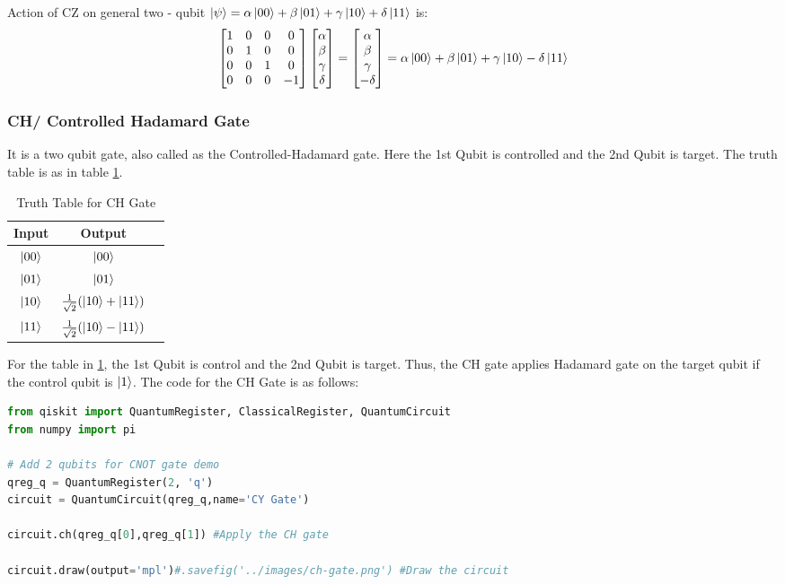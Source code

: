 Action of CZ on general two - qubit $\ket{\psi} = \alpha\ket{00}+\beta\ket{01}+\gamma\ket{10}+\delta\ket{11}$ is:
\[
    \begin{bmatrix} 
        1 & 0 & 0 & 0 \\
        0 & 1 & 0 & 0 \\
        0 & 0 & 1 & 0 \\
        0 & 0 & 0 & -1
    \end{bmatrix}\begin{bmatrix}
        \alpha \\
        \beta \\
        \gamma \\
        \delta
    \end{bmatrix}=\begin{bmatrix}
        \alpha \\
        \beta \\
        \gamma \\
        -\delta
    \end{bmatrix}=\alpha\ket{00}+\beta\ket{01}+\gamma\ket{10}-\delta\ket{11}
\]

\subsubsection{CH/ Controlled Hadamard Gate}
It is a two qubit gate, also called as the Controlled-Hadamard gate.
Here the 1st Qubit is controlled and the 2nd Qubit is target.
The truth table is as in table \ref{tab:ch}.
\begin{table}[ht]
    \centering
    \begin{tabular}{|c|c|c|}
        \hline
        Input & Output\\
        \hline
        $\ket{00}$ & $\ket{00}$\\
        $\ket{01}$   & $\ket{01}$\\
        $\ket{10}$   & $\frac{1}{\sqrt{2}}(\ket{10}+\ket{11})$\\
        $\ket{11}$  & $\frac{1}{\sqrt{2}}(\ket{10}-\ket{11})$\\
        \hline
    \end{tabular}
    \caption{Truth Table for CH Gate}
    \label{tab:ch}
\end{table}
For the table in \ref{tab:ch}, the 1st Qubit is control and the 2nd Qubit is target.
Thus, the CH gate applies Hadamard gate on the target qubit if the control qubit is $\ket{1}$.
The code for the CH Gate is as follows:
\begin{lstlisting}[language=Python]
from qiskit import QuantumRegister, ClassicalRegister, QuantumCircuit
from numpy import pi

# Add 2 qubits for CNOT gate demo
qreg_q = QuantumRegister(2, 'q')
circuit = QuantumCircuit(qreg_q,name='CY Gate')

circuit.ch(qreg_q[0],qreg_q[1]) #Apply the CH gate

circuit.draw(output='mpl')#.savefig('../images/ch-gate.png') #Draw the circuit
\end{lstlisting}

